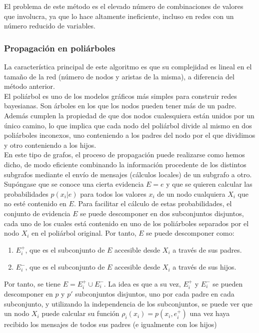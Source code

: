 \documentclass{article}
\begin{document}
El problema de este método es el elevado número de combinaciones de valores que involucra, ya que lo hace altamente ineficiente, incluso en redes con un número reducido de variables.

\subsubsection{Propagación en poliárboles}
La característica principal de este algoritmo es que su complejidad es lineal en el tamaño de la red (número de nodos y aristas de la misma), a diferencia del método anterior.\\
El poliárbol es uno de los modelos gráficos más simples para construir redes bayesianas. Son árboles en los que los nodos pueden tener más de un padre. Además cumplen la propiedad de que dos nodos cualesquiera están unidos por un único camino, lo que implica que cada nodo del poliárbol divide al mismo en dos poliárboles inconexos, uno conteniendo a los padres del nodo por el que dividimos y otro conteniendo a los hijos.\\
En este tipo de grafos, el proceso de propagación puede realizarse como hemos dicho, de modo eficiente combinando la información procedente de los distintos subgrafos mediante el envío de mensajes (cálculos locales) de un subgrafo a otro. Supóngase que se conoce una cierta evidencia $E=e$ y que se quieren calcular las probabilidades $p(x_i|e)$ para todos los valores $x_i$ de un nodo cualquiera $X_i$ que no esté contenido en $E$. Para facilitar el cálculo de estas probabilidades, el conjunto de evidencia $E$ se puede descomponer en dos subconjuntos disjuntos, cada uno de los cuales está contenido en uno de los poliárboles separados por el nodo $X_i$ en el poliárbol original. Por tanto, $E$ se puede descomponer como:
\begin{enumerate}
\item $E_i^+$, que es el subconjunto de $E$ accesible desde $X_i$ a través de sus padres.
\item $E_i^-$, que es el subconjunto de $E$ accesible desde $X_i$ a través de sus hijos.
\end{enumerate}
Por tanto, se tiene $E=E_i^+ \cup E_i^-$. La idea es que a su vez, $E_i^+$ y $E_i^-$ se pueden descomponer en $p$ y $p'$ subconjuntos disjuntos, uno por cada padre en cada subconjunto, y utilizando la independencia de los subconjuntos, se puede ver que un nodo $X_i$ puede calcular su función $\rho_i(x_i)=p(x_i,e_i^+)$ una vez haya recibido los mensajes de todos sus padres (e igualmente con los hijos)
\end{document}
